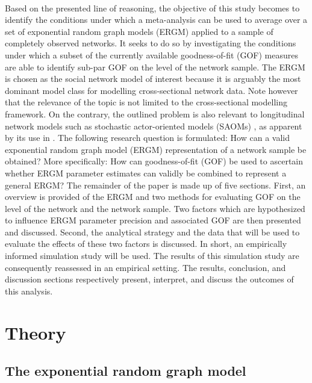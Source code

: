 \documentclass[a4paper, man]{apa6}
\begin{document}
\\ 
Based on the presented line of reasoning, the objective of this study becomes to identify the conditions under which a meta-analysis can be used to average over a set of exponential random graph models (ERGM) applied to a sample of completely observed networks. It seeks to do so by investigating the conditions under which a subset of the currently available goodness-of-fit (GOF) measures are able to identify sub-par GOF on the level of the network sample. The ERGM is chosen as the social network model of interest because it is arguably the most dominant model class for modelling cross-sectional network data. Note however that the relevance of the topic is not limited to the cross-sectional modelling framework. On the contrary, the outlined problem is also relevant to longitudinal network models such as stochastic actor-oriented models (SAOMs) \cite{snijders2001statistical}, as apparent by its use in . 
\clearpage 
The following research question is formulated: How can a valid exponential random graph model (ERGM) representation of a network sample be obtained? \noindent More specifically: How can goodness-of-fit (GOF) be used to ascertain whether ERGM parameter estimates can validly be combined to represent a general ERGM? The remainder of the paper is made up of five sections. First, an overview is provided of the ERGM and two methods for evaluating GOF on the level of the network and the network sample. Two factors which are hypothesized to influence ERGM parameter precision and associated GOF are then presented and discussed. Second, the analytical strategy and the data that will be used to evaluate the effects of these two factors is discussed. In short, an empirically informed simulation study will be used. The results of this simulation study are consequently reassessed in an empirical setting. The results, conclusion, and discussion sections respectively present, interpret, and discuss the outcomes of this analysis.

\section{Theory}
\subsection{The exponential random graph model}
\end{document}
